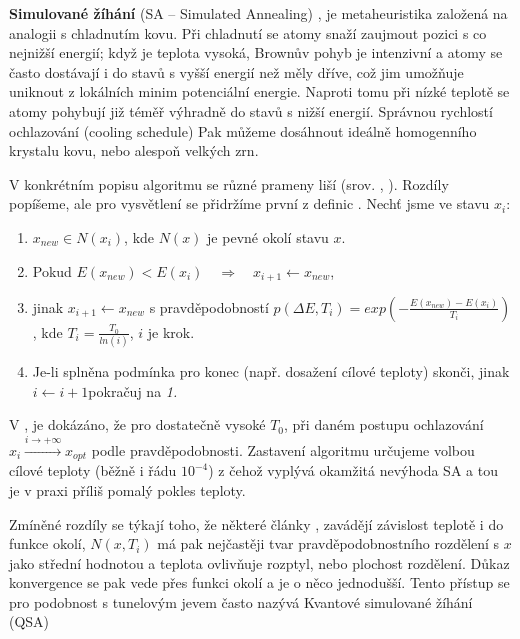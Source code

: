 \textbf{Simulované žíhání} (SA -- Simulated Annealing) \cite{SA Hajek}, \cite{SA Tsitsiklis} je metaheuristika založená na analogii s chladnutím kovu. Při chladnutí se atomy snaží zaujmout pozici s co nejnižší energií; když je teplota vysoká, Brownův pohyb je intenzivní a atomy se často dostávají i do stavů s vyšší energií než měly dříve, což jim umožňuje uniknout z lokálních minim potenciální energie. Naproti tomu při nízké teplotě se atomy pohybují již téměř výhradně do stavů s nižší energií. Správnou rychlostí ochlazování (cooling schedule) Pak můžeme dosáhnout ideálně homogenního krystalu kovu, nebo alespoň velkých zrn.

V konkrétním popisu algoritmu se různé prameny liší (srov. \cite{SA Hajek}, \cite{VFSA}). Rozdíly popíšeme, ale pro vysvětlení se přidržíme první z definic . Nechť jsme ve stavu $x_i$:
\begin{enumerate}
  \item $x_{new} \in N(x_i)$, kde $N(x)$ je pevné okolí stavu $x$.
  \item Pokud $E(x_{new}) < E(x_i) \quad\Rightarrow\quad x_{i+1} \leftarrow x_{new}$,
  \item jinak $x_{i+1} \leftarrow x_{new}$ s pravděpodobností $p(\Delta E,T_i) = exp(-\frac{E(x_{new}) - E(x_i)}{T_i})$,
    \newline kde $T_i = \frac{T_0}{ln(i)}$, $i$ je krok.
  \item Je-li splněna podmínka pro konec (např. dosažení cílové teploty) skonči, jinak $i\leftarrow i+1$pokračuj na \textit{1.}
\end{enumerate}


V \cite{SA Hajek}, \cite{SA Tsitsiklis} je dokázáno, že pro dostatečně vysoké $T_0$, při daném postupu ochlazování $x_i \xrightarrow{i \to +\infty} x_{opt}$ podle pravděpodobnosti. Zastavení algoritmu určujeme volbou cílové teploty (běžně i řádu $10^{-4}$) z čehož vyplývá okamžitá nevýhoda SA a tou je v praxi příliš pomalý pokles teploty.

Zmíněné rozdíly se týkají toho, že některé články \cite{SA survey},\cite{VFSA} zavádějí závislost teplotě i do funkce okolí, $N(x,T_i)$ má pak nejčastěji tvar pravděpodobnostního rozdělení s $x$ jako střední hodnotou a teplota ovlivňuje rozptyl, nebo plochost rozdělení. Důkaz konvergence se pak vede přes funkci okolí a je o něco jednodušší. Tento přístup se pro podobnost s tunelovým jevem často nazývá Kvantové simulované žíhání (QSA)

